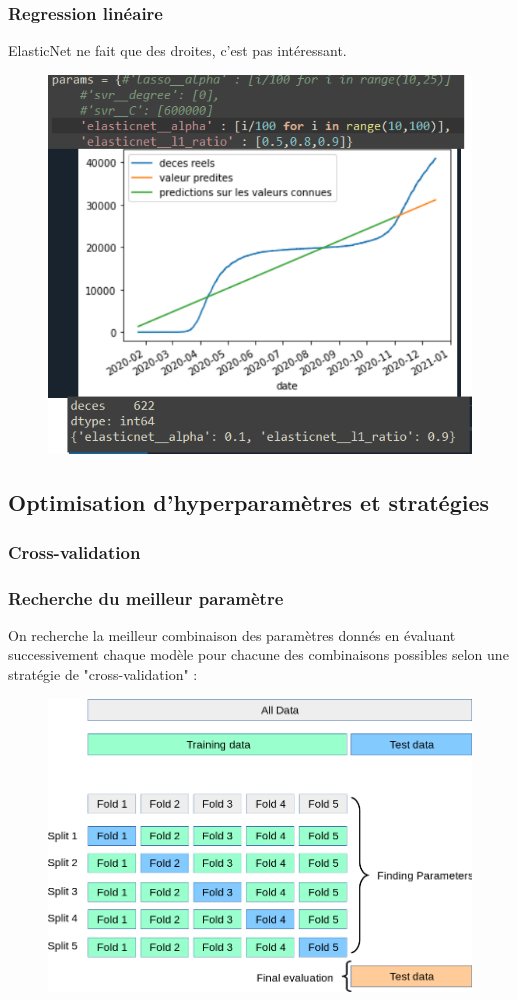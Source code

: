 \documentclass{beamer}
\begin{document}
\begin{frame}
	\frametitle{Regression linéaire}
	ElasticNet ne fait que des droites, c'est pas intéressant.
	\begin{figure}[b]
		\includegraphics[scale=0.4]{EN}
		\centering
	\end{figure}
\end{frame}

\subsection{Optimisation d'hyperparamètres et stratégies}
\subsubsection{Cross-validation}
\begin{frame}
	\frametitle{Recherche du meilleur paramètre}
	On recherche la meilleur combinaison des paramètres donnés en évaluant successivement chaque modèle pour chacune des combinaisons possibles selon une stratégie de "cross-validation" :
	\begin{figure}[b]
		\centering
		\includegraphics[scale=0.2]{gscv}
	\end{figure}
\end{frame}
\end{document}
